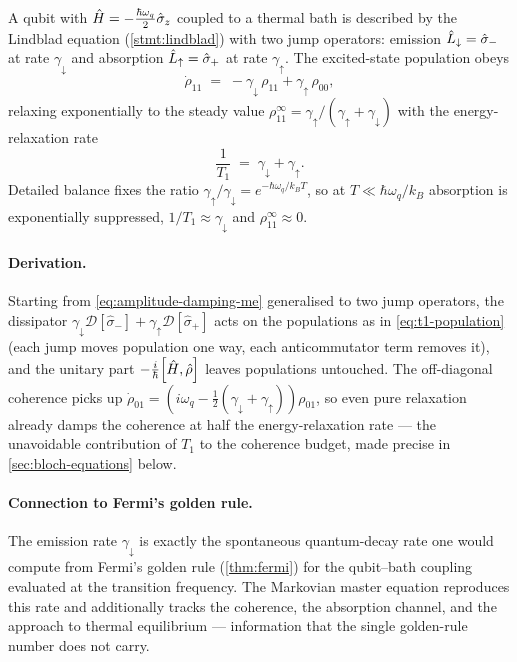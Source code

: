 \begin{statement}
\label{stmt:t1}
A qubit with $\hat{H}=-\tfrac{\hbar\omega_q}{2}\hat\sigma_z$ coupled to
a thermal bath is described by the Lindblad equation
(\cref{stmt:lindblad}) with two jump operators: emission
$\hat{L}_\downarrow=\hat\sigma_-$ at rate $\gamma_\downarrow$ and
absorption $\hat{L}_\uparrow=\hat\sigma_+$ at rate $\gamma_\uparrow$.
The excited-state population obeys
\begin{equation}
\label{eq:t1-population}
\dot\rho_{11} \;=\; -\gamma_\downarrow\,\rho_{11} + \gamma_\uparrow\,\rho_{00},
\end{equation}
relaxing exponentially to the steady value
$\rho_{11}^{\infty}=\gamma_\uparrow/(\gamma_\uparrow+\gamma_\downarrow)$
with the energy-relaxation rate
\begin{equation}
\label{eq:t1-rate}
\frac{1}{T_1} \;=\; \gamma_\downarrow + \gamma_\uparrow.
\end{equation}
Detailed balance fixes the ratio
$\gamma_\uparrow/\gamma_\downarrow=e^{-\hbar\omega_q/k_B T}$, so at
$T\ll\hbar\omega_q/k_B$ absorption is exponentially suppressed,
$1/T_1\approx\gamma_\downarrow$ and $\rho_{11}^\infty\approx0$.
\end{statement}

\paragraph{Derivation.}
Starting from \cref{eq:amplitude-damping-me} generalised to two
jump operators, the dissipator
$\gamma_\downarrow\mathcal D[\hat\sigma_-]+\gamma_\uparrow\mathcal D[\hat\sigma_+]$
acts on the populations as in \cref{eq:t1-population} (each jump
moves population one way, each anticommutator term removes it),
and the unitary part $-\tfrac{i}{\hbar}\comm{\op H}{\op\rho}$ leaves
populations untouched. The off-diagonal coherence picks up
$\dot\rho_{01}=(i\omega_q-\tfrac12(\gamma_\downarrow+\gamma_\uparrow))\rho_{01}$,
so even pure relaxation already damps the coherence at half the
energy-relaxation rate --- the unavoidable contribution of $T_1$ to
the coherence budget, made precise in \cref{sec:bloch-equations} below.

\paragraph{Connection to Fermi's golden rule.}
The emission rate $\gamma_\downarrow$ is exactly the spontaneous
quantum-decay rate one would compute from Fermi's golden rule
(\cref{thm:fermi}) for the qubit--bath coupling evaluated at the
transition frequency. The Markovian master equation reproduces this
rate and additionally tracks the coherence, the absorption channel,
and the approach to thermal equilibrium --- information that the
single golden-rule number does not carry.

